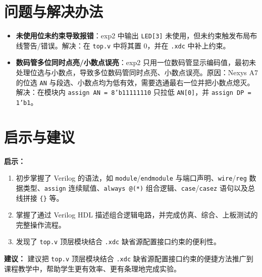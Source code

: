 \documentclass[12pt, a4paper]{ctexart}
\begin{document}
\section{问题与解决办法}
\begin{itemize}
    \item \textbf{未使用位未约束导致报错}：exp2 中输出 \texttt{LED[3]} 未使用，但未约束触发布局布线警告/错误。解决：在 \texttt{top.v} 中将其置 0，并在 \texttt{.xdc} 中补上约束。
    \item \textbf{数码管多位同时点亮/小数点误亮}：exp2 只用一位数码管显示编码值，最初未处理位选与小数点，导致多位数码管同时点亮、小数点误亮。原因：Nexys A7 的位选 \texttt{AN} 与段选、小数点均为低有效，需要选通最右一位并把小数点熄灭。解决：在模块内 \texttt{assign AN = 8'b11111110} 只拉低 \texttt{AN[0]}，并 \texttt{assign DP = 1'b1}。
\end{itemize}

\section{启示与建议}

\textbf{启示：}
\begin{enumerate}
    \item 初步掌握了 Verilog 的语法，如 \texttt{module}/\texttt{endmodule} 与端口声明、\texttt{wire}/\texttt{reg} 数据类型、\texttt{assign} 连续赋值、\texttt{always @(*)} 组合逻辑、\texttt{case}/\texttt{casez} 语句以及总线拼接 \texttt{\{\}} 等。
    \item 掌握了通过 Verilog HDL 描述组合逻辑电路，并完成仿真、综合、上板测试的完整操作流程。
    \item 发现了 \texttt{top.v} 顶层模块结合 \texttt{.xdc} 缺省源配置接口约束的便利性。
\end{enumerate}

\textbf{建议：} 建议把 \texttt{top.v} 顶层模块结合 \texttt{.xdc} 缺省源配置接口约束的便捷方法推广到课程教学中，帮助学生更有效率、更有条理地完成实验。
\end{document}
